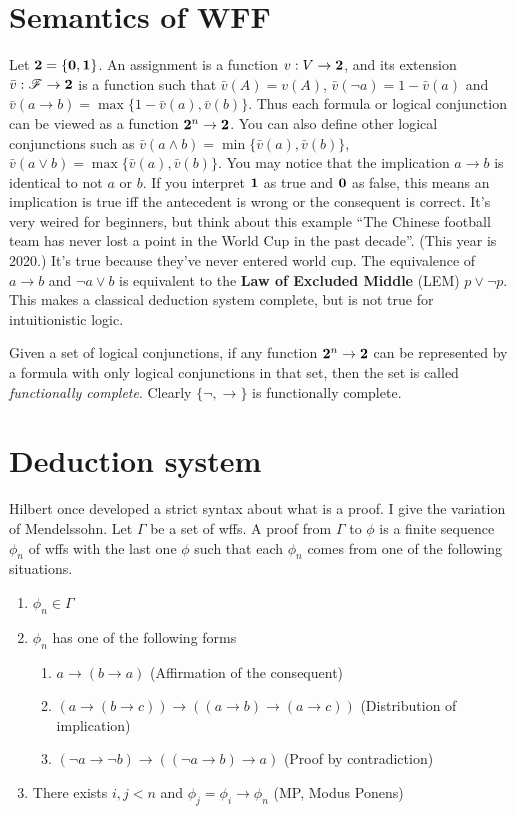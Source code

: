 \section{Semantics of WFF}
Let $\mathbf{2}=\{\mathbf{0},\mathbf{1}\}$. An assignment is a function $v: V\to \mathbf{2}$, and
its extension $\bar{v}:\mathscr{F} \to \mathbf{2}$ is a function such that
$\bar{v}(A)=v(A)$, $\bar{v}(\neg a)=1 - \bar{v}(a)$ and 
$\bar{v}(a\to b)=\max\{1-\bar{v}(a),\bar{v}(b)\}$.
Thus each formula or logical conjunction 
can be viewed as a function $\mathbf{2}^n\to\mathbf{2}$. You can
also define other logical conjunctions such as $\bar{v}(a\wedge b)=
\min\{\bar{v}(a),\bar{v}(b)\}$, $\bar{v}(a\vee b)=
\max\{\bar{v}(a),\bar{v}(b)\}$. You may notice that the implication 
$a\to b$ is identical to not $a$ or $b$. If you interpret $\mathbf{1}$ as
true and $\mathbf{0}$ as false, this means an implication is true iff
the antecedent is wrong or the consequent is correct. It's very
weired for beginners, but think about this example  
``The Chinese football team has never lost a point in the World Cup
in the past decade''. (This year is 2020.) It's true because they've
never entered world cup. The equivalence of $a\to b$ and $\neg a\vee b$
is equivalent to the {\bf Law of Excluded Middle} (LEM) $p\vee\neg p$.
This makes a classical deduction system complete, but is not true
for intuitionistic logic. 

Given a set of logical conjunctions, if any
function $\mathbf{2}^n\to\mathbf{2}$ can be represented by a formula with only
logical conjunctions in that set, then the set is called {\it
functionally complete}. Clearly $\{\neg,\to\}$ is functionally
complete.

\section{Deduction system}
Hilbert once developed a strict syntax about what is a proof. I
give the variation of Mendelssohn. Let $\Gamma$ be a set of wffs.
A proof from $\Gamma$ to $\phi$ is a finite sequence $\phi_n$ of
wffs with the last one $\phi$ such that each $\phi_n$ comes from
one of the following situations.

\begin{enumerate}
    \item $\phi_n\in\Gamma$
    \item $\phi_n$ has one of the following forms 
        \begin{enumerate}
            \item $a\to (b\to a)$ (Affirmation of the consequent)
            \item $(a\to(b\to c))\to((a\to b)\to(a\to c))$ (Distribution of implication)
            \item $(\neg a\to\neg b)\to((\neg a\to b)\to a)$ (Proof by contradiction)
        \end{enumerate}
    \item There exists $i,j<n$ and $\phi_j=\phi_i\to\phi_n$ (MP, Modus Ponens)
\end{enumerate}

